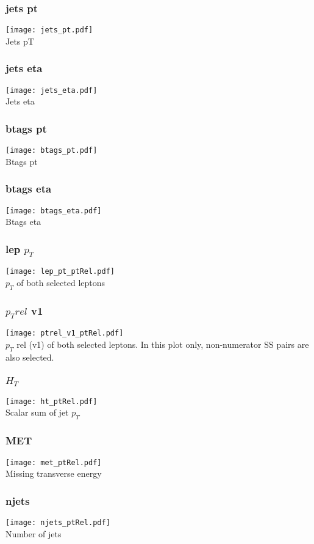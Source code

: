 \documentclass{beamer}
\begin{document}
\begin{frame}
\frametitle{jets pt}
\texttt{[image: jets\_pt.pdf]} \\
Jets pT
\end{frame}

\begin{frame}
\frametitle{jets eta}
\texttt{[image: jets\_eta.pdf]} \\
Jets eta
\end{frame}

\begin{frame}
\frametitle{btags pt}
\texttt{[image: btags\_pt.pdf]} \\
Btags pt
\end{frame}

\begin{frame}
\frametitle{btags eta}
\texttt{[image: btags\_eta.pdf]} \\
Btags eta
\end{frame}

\begin{frame}
\frametitle{lep $p_T$}
\texttt{[image: lep\_pt\_ptRel.pdf]} \\
$p_T$ of both selected leptons
\end{frame}

\begin{frame}
\frametitle{$p_T rel$ v1}
\texttt{[image: ptrel\_v1\_ptRel.pdf]} \\
$p_T$ rel (v1) of both selected leptons.  In this plot only, non-numerator SS pairs are also selected.  
\end{frame}

\begin{frame}
\frametitle{$H_T$}
\texttt{[image: ht\_ptRel.pdf]} \\
Scalar sum of jet $p_T$
\end{frame}

\begin{frame}
\frametitle{MET}
\texttt{[image: met\_ptRel.pdf]} \\
Missing transverse energy
\end{frame}

\begin{frame}
\frametitle{njets}
\texttt{[image: njets\_ptRel.pdf]} \\
Number of jets
\end{frame}
\end{document}
